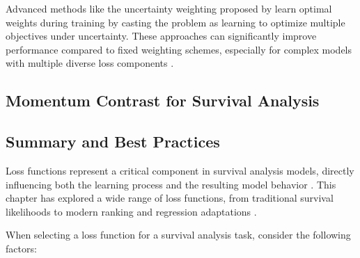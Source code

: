 Advanced methods like the uncertainty weighting proposed by \textcite{kendall2018} learn optimal weights during training by casting the problem as learning to optimize multiple objectives under uncertainty. These approaches can significantly improve performance compared to fixed weighting schemes, especially for complex models with multiple diverse loss components \parencite{fotso2018}.

\subsection{Momentum Contrast for Survival Analysis}



\subsection{Summary and Best Practices}

Loss functions represent a critical component in survival analysis models, directly influencing both the learning process and the resulting model behavior \parencite{lee2018,kvamme2019,nagpal2021dsm}. This chapter has explored a wide range of loss functions, from traditional survival likelihoods to modern ranking and regression adaptations \parencite{harrell1982,ibrahim2001,kvamme2021survrnc}.

When selecting a loss function for a survival analysis task, consider the following factors:

